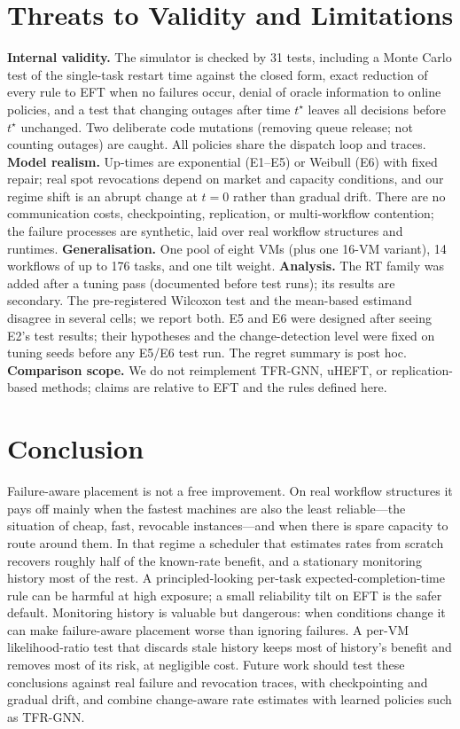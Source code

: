 \documentclass[conference]{IEEEtran}
\newcommand{\EFT}{\textsf{EFT}}
\newcommand{\RT}{\textsf{RT}}
\begin{document}
\section{Threats to Validity and Limitations}
\label{sec:validation}
\textbf{Internal validity.} The simulator is checked by 31 tests, including a Monte Carlo test of the single-task restart time
against the closed form, exact reduction of every rule to \EFT{} when no failures occur, denial of oracle information to online
policies, and a test that changing outages after time $t^\star$ leaves all decisions before $t^\star$ unchanged. Two deliberate
code mutations (removing queue release; not counting outages) are caught. All policies share the dispatch loop and traces.
\textbf{Model realism.} Up-times are exponential (E1--E5) or Weibull (E6) with fixed repair; real spot revocations depend on
market and capacity conditions, and our regime shift is an abrupt change at $t=0$ rather than gradual drift. There are no communication costs, checkpointing, replication, or multi-workflow contention;
the failure processes are synthetic, laid over real workflow structures and runtimes. \textbf{Generalisation.} One pool of
eight VMs (plus one 16-VM variant), 14 workflows of up to 176 tasks, and one tilt weight. \textbf{Analysis.} The \RT{} family was
added after a tuning pass (documented before test runs); its results are secondary. The pre-registered Wilcoxon test and the
mean-based estimand disagree in several cells; we report both. E5 and E6 were designed after seeing E2's test results; their
hypotheses and the change-detection level were fixed on tuning seeds before any E5/E6 test run. The regret summary is post hoc. \textbf{Comparison scope.} We do not reimplement TFR-GNN, uHEFT,
or replication-based methods; claims are relative to \EFT{} and the rules defined here.

\section{Conclusion}
Failure-aware placement is not a free improvement. On real workflow structures it pays off mainly when the fastest machines are
also the least reliable---the situation of cheap, fast, revocable instances---and when there is spare capacity to route around
them. In that regime a scheduler that estimates rates from scratch recovers roughly half of the known-rate benefit, and a
stationary monitoring history most of the rest. A principled-looking per-task expected-completion-time rule can be harmful at high
exposure; a small reliability tilt on EFT is the safer default. Monitoring history is valuable but dangerous: when conditions
change it can make failure-aware placement worse than ignoring failures. A per-VM likelihood-ratio test that discards stale
history keeps most of history's benefit and removes most of its risk, at negligible cost. Future work should test these
conclusions against real failure and revocation traces, with checkpointing and gradual drift, and combine change-aware rate
estimates with learned policies such as TFR-GNN.
\end{document}
